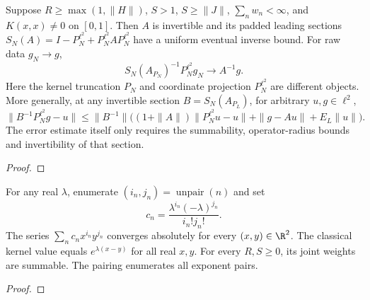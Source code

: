 \begin{theorem}
\label{thm:volterra-series-solves}
\leanok
Suppose $R\ge\max(1,\|H\|)$, $S>1$, $S\ge\|J\|$, $\sum_nw_n<\infty$,
and $K(x,x)\ne0$ on $[0,1]$. Then $A$ is invertible and its padded leading
sections $S_N(A)=I-P_N^{\ell^2}+P_N^{\ell^2}AP_N^{\ell^2}$ have a uniform
eventual inverse bound. For raw data $g_N\to g$,
\[
 S_N(A_{P_N})^{-1}P_N^{\ell^2}g_N\to A^{-1}g.
\]
Here the kernel truncation $P_N$ and coordinate projection $P_N^{\ell^2}$
are different objects. More generally, at any invertible section
$B=S_N(A_{P_L})$, for arbitrary $u,g\in\ell^2$,
\[
 \|B^{-1}P_N^{\ell^2}g-u\|\le\|B^{-1}\|
 \big((1+\|A\|)\|P_N^{\ell^2}u-u\|+\|g-Au\|+E_L\|u\|\big).
\]
 The error estimate itself only requires the summability,
operator-radius bounds and invertibility of that section.
\end{theorem}
\begin{proof}
\leanok
\end{proof}



\begin{supporting}
\begin{theorem}
\label{thm:volterra-exponential-series}
\leanok
For any real $\lambda$, enumerate $(i_n,j_n)=\operatorname{unpair}(n)$ and set
\[
 c_n=\frac{\lambda^{i_n}(-\lambda)^{j_n}}{i_n!j_n!}.
\]
The series $\sum_n c_n x^{i_n}y^{j_n}$ converges absolutely for every $(x,y)\in\R^2$.
The classical kernel value equals $e^{\lambda(x-y)}$ for all real $x,y$.
For every $R,S\ge0$, its joint weights are summable.
The pairing enumerates all exponent pairs.
\end{theorem}
\begin{proof}
\leanok
\end{proof}
\end{supporting}


